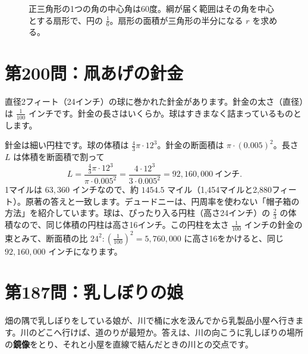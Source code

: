 \documentclass[a4paper,11pt,openany]{ltjsbook}
\begin{document}
\begin{figure}[htbp]
\centering
{}
\caption{正三角形の1つの角の中心角は60度。綱が届く範囲はその角を中心とする扇形で、円の $\tfrac16$。扇形の面積が三角形の半分になる $r$ を求める。}
\end{figure}

\section{第200問：凧あげの針金}

直径2フィート（24インチ）の球に巻かれた針金があります。針金の太さ（直径）は $\tfrac1{100}$ インチです。針金の長さはいくらか。球はすきまなく詰まっているものとします。

針金は細い円柱です。球の体積は $\tfrac43\pi\cdot12^3$。針金の断面積は $\pi\cdot(0.005)^2$。長さ $L$ は体積を断面積で割って
\[
L=\frac{\tfrac43\pi\cdot12^3}{\pi\cdot0.005^2}=\frac{4\cdot12^3}{3\cdot0.005^2}=92{,}160{,}000\ \text{インチ}.
\]
1マイルは $63{,}360$ インチなので、約 $1454.5$ マイル（1,454マイルと2,880フィート）。原著の答えと一致します。デュードニーは、円周率を使わない「帽子箱の方法」を紹介しています。球は、ぴったり入る円柱（高さ24インチ）の $\tfrac23$ の体積なので、同じ体積の円柱は高さ16インチ。この円柱を太さ $\tfrac1{100}$ インチの針金の束とみて、断面積の比 $24^2:(\tfrac1{100})^2=5{,}760{,}000$ に高さ16をかけると、同じ $92{,}160{,}000$ インチになります。

\section{第187問：乳しぼりの娘}

畑の隅で乳しぼりをしている娘が、川で桶に水を汲んでから乳製品小屋へ行きます。川のどこへ行けば、道のりが最短か。答えは、川の向こうに乳しぼりの場所の\textbf{鏡像}をとり、それと小屋を直線で結んだときの川との交点です。
\end{document}
